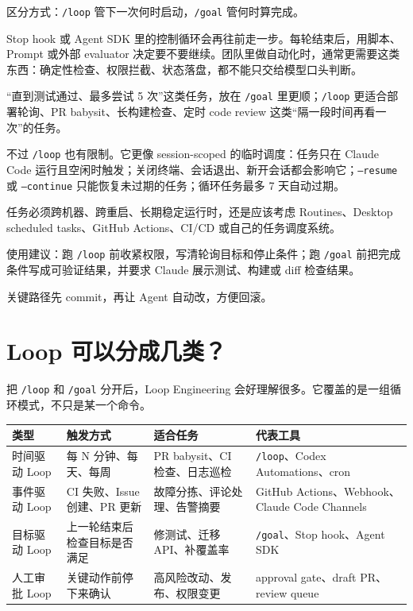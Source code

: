 \documentclass[9pt,a4paper,twocolumn]{ctexart}
\begin{document}
区分方式：\texttt{/loop} 管下一次何时启动，\texttt{/goal} 管何时算完成。



Stop hook 或 Agent SDK 里的控制循环会再往前走一步。每轮结束后，用脚本、Prompt 或外部 evaluator 决定要不要继续。团队里做自动化时，通常更需要这类东西：确定性检查、权限拦截、状态落盘，都不能只交给模型口头判断。



“直到测试通过、最多尝试 5 次”这类任务，放在 \texttt{/goal} 里更顺；\texttt{/loop} 更适合部署轮询、PR babysit、长构建检查、定时 code review 这类“隔一段时间再看一次”的任务。



不过 \texttt{/loop} 也有限制。它更像 session-scoped 的临时调度：任务只在 Claude Code 运行且空闲时触发；关闭终端、会话退出、新开会话都会影响它；\texttt{--resume} 或 \texttt{--continue} 只能恢复未过期的任务；循环任务最多 7 天自动过期。



任务必须跨机器、跨重启、长期稳定运行时，还是应该考虑 Routines、Desktop scheduled tasks、GitHub Actions、CI/CD 或自己的任务调度系统。



使用建议：跑 \texttt{/loop} 前收紧权限，写清轮询目标和停止条件；跑 \texttt{/goal} 前把完成条件写成可验证结果，并要求 Claude 展示测试、构建或 diff 检查结果。



关键路径先 commit，再让 Agent 自动改，方便回滚。



\section*{Loop 可以分成几类？}


把 \texttt{/loop} 和 \texttt{/goal} 分开后，Loop Engineering 会好理解很多。它覆盖的是一组循环模式，不只是某一个命令。


{\footnotesize
\begin{tabular}{|p{}|p{}|p{}|p{}|}
\hline
\textbf{类型} & \textbf{触发方式} & \textbf{适合任务} & \textbf{代表工具} \\
\hline
时间驱动 Loop & 每 N 分钟、每天、每周 & PR babysit、CI 检查、日志巡检 & \texttt{/loop}、Codex Automations、cron \\
\hline
事件驱动 Loop & CI 失败、Issue 创建、PR 更新 & 故障分拣、评论处理、告警摘要 & GitHub Actions、Webhook、Claude Code Channels \\
\hline
目标驱动 Loop & 上一轮结束后检查目标是否满足 & 修测试、迁移 API、补覆盖率 & \texttt{/goal}、Stop hook、Agent SDK \\
\hline
人工审批 Loop & 关键动作前停下来确认 & 高风险改动、发布、权限变更 & approval gate、draft PR、review queue \\
\hline
\end{tabular}
}
\end{document}

